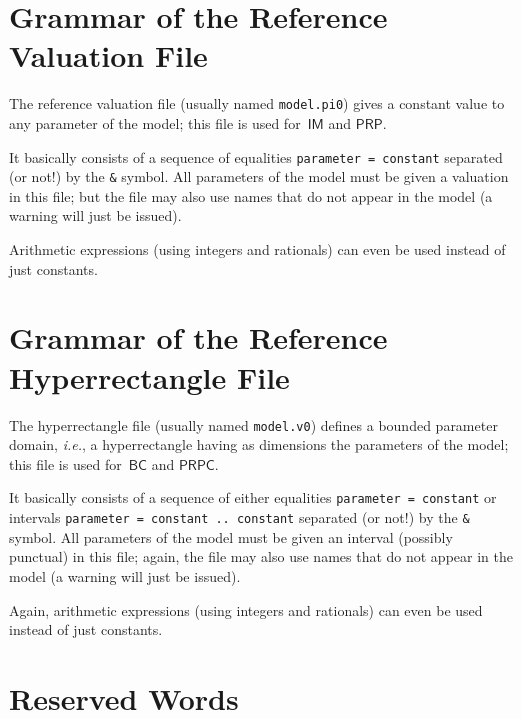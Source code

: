\documentclass[a4paper,11pt]{report}
\makeatletter
\newcommand{\BC}{\ensuremath{\mathsf{BC}}}
\newcommand{\IM}{\ensuremath{\mathsf{IM}}}
\newcommand{\PRP}{\ensuremath{\mathsf{PRP}}}
\newcommand{\PRPC}{\ensuremath{\mathsf{PRPC}}}
\newcommand{\styleIMI}[1]{\textcolor{imicolor}{\texttt{#1}}}
\newcommand{\stylePath}[1]{\textcolor{pathcolor}{\texttt{#1}}}
\newcommand{\ie}{\textcolor{colorok}{\textit{i.e.},\@}}
\makeatother
\begin{document}
\section{Grammar of the Reference Valuation File}

The reference valuation file (usually named \stylePath{model.pi0}) gives a constant value to any parameter of the model;
this file is used for~\IM{} and \PRP{}.

It basically consists of a sequence of equalities \styleIMI{parameter = constant} separated (or not!) by the \styleIMI{\&} symbol.
All parameters of the model must be given a valuation in this file; but the file may also use names that do not appear in the model (a warning will just be issued).

Arithmetic expressions (using integers and rationals) can even be used instead of just constants.



\section{Grammar of the Reference Hyperrectangle File}

The hyperrectangle file (usually named \stylePath{model.v0}) defines a bounded parameter domain, \ie{} a hyperrectangle having as dimensions the parameters of the model;
this file is used for~\BC{} and \PRPC{}.

It basically consists of a sequence of either equalities \styleIMI{parameter = constant} or intervals \styleIMI{parameter = constant .. constant} separated (or not!) by the \styleIMI{\&} symbol.
All parameters of the model must be given an interval (possibly punctual) in this file; again, the file may also use names that do not appear in the model (a warning will just be issued).

Again, arithmetic expressions (using integers and rationals) can even be used instead of just constants.



\section{Reserved Words}
\end{document}

